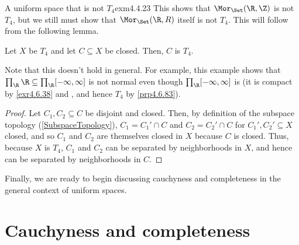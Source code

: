 \begin{exm}{A uniform space that is not $T_4$}{exm4.4.23}
This shows that $\Mor _{\Set}(\R ,\Z )$ is not $T_4$, but we still must show that $\Mor _{\Set}(\R ,\\R )$ itself is not $T_4$.  This will follow from the following lemma.
\begin{lma}[break at=8cm/25cm]{}{}
Let $X$ be $T_4$ and let $C\subseteq X$ be closed.  Then, $C$ is $T_4$.
\begin{rmk}
Note that this doesn't hold in general.  For example, this example shows that $\prod _{\R}\R \subseteq \prod _{\R}[-\infty ,\infty ]$ is not normal even though $\prod _{\R}[-\infty ,\infty ]$ is (it is compact by \cref{exr4.6.38} and , and hence $T_4$ by \cref{prp4.6.83}).
\end{rmk}
\begin{proof}
Let $C_1,C_2\subseteq C$ be disjoint and closed.  Then, by definition of the subspace topology (\cref{SubspaceTopology}), $C_1=C_1'\cap C$ and $C_2=C_2'\cap C$ for $C_1',C_2'\subseteq X$ closed, and so $C_1$ and $C_2$ are themselves closed in $X$ because $C$ is closed.  Thus, because $X$ is $T_4$, $C_1$ and $C_2$ can be separated by neighborhoods in $X$, and hence can be separated by neighborhoods in $C$.
\end{proof}
\end{lma}
\end{exm}

Finally, we are ready to begin discussing cauchyness and completeness in the general context of uniform spaces.

\section{Cauchyness and completeness}

